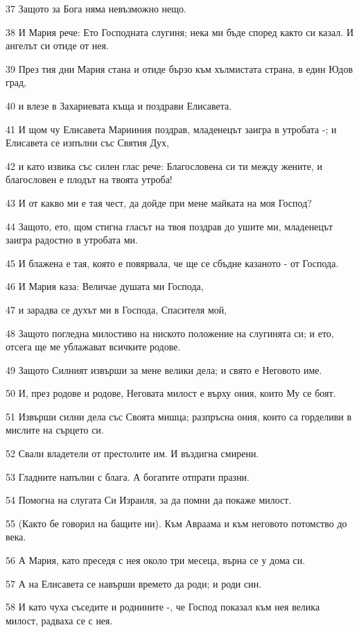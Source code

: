 \par 37 Защото за Бога няма невъзможно нещо.
\par 38 И Мария рече: Ето Господната слугиня; нека ми бъде според както си казал. И ангелът си отиде от нея.
\par 39 През тия дни Мария стана и отиде бързо към хълмистата страна, в един Юдов град,
\par 40 и влезе в Захариевата къща и поздрави Елисавета.
\par 41 И щом чу Елисавета Марииния поздрав, младенецът заигра в утробата -; и Елисавета се изпълни със Святия Дух,
\par 42 и като извика със силен глас рече: Благословена си ти между жените, и благословен е плодът на твоята утроба!
\par 43 И от какво ми е тая чест, да дойде при мене майката на моя Господ?
\par 44 Защото, ето, щом стигна гласът на твоя поздрав до ушите ми, младенецът заигра радостно в утробата ми.
\par 45 И блажена е тая, която е повярвала, че ще се сбъдне казаното - от Господа.
\par 46 И Мария каза: Величае душата ми Господа,
\par 47 и зарадва се духът ми в Господа, Спасителя мой,
\par 48 Защото погледна милостиво на ниското положение на слугинята си; и ето, отсега ще ме ублажават всичките родове.
\par 49 Защото Силният извърши за мене велики дела; и свято е Неговото име.
\par 50 И, през родове и родове, Неговата милост е върху ония, които Му се боят.
\par 51 Извърши силни дела със Своята мишца; разпръсна ония, които са горделиви в мислите на сърцето си.
\par 52 Свали владетели от престолите им. И въздигна смирени.
\par 53 Гладните напълни с блага. А богатите отпрати празни.
\par 54 Помогна на слугата Си Израиля, за да помни да покаже милост.
\par 55 (Както бе говорил на бащите ни). Към Авраама и към неговото потомство до века.
\par 56 А Мария, като преседя с нея около три месеца, върна се у дома си.
\par 57 А на Елисавета се навърши времето да роди; и роди син.
\par 58 И като чуха съседите и роднините -, че Господ показал към нея велика милост, радваха се с нея.
